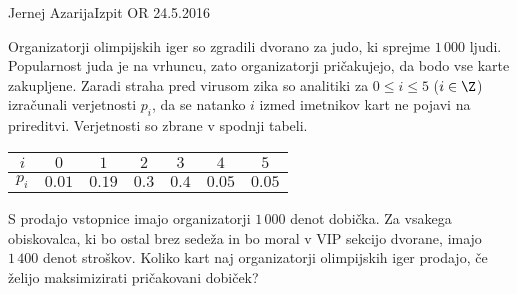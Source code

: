 \begin{naloga}{Jernej Azarija}{Izpit OR 24.5.2016}
\begin{vprasanje}
Organizatorji olimpijskih iger so zgradili dvorano za judo,
ki sprejme $1\,000$ ljudi.
Popularnost juda je na vrhuncu,
zato organizatorji pričakujejo, da bodo vse karte zakupljene.
Zaradi straha pred virusom zika so analitiki
za $0 \le i \le 5$ ($i \in \Z$) izračunali verjetnosti $p_i$,
da se natanko $i$ izmed imetnikov kart ne pojavi na prireditvi.
Verjetnosti so zbrane v spodnji tabeli.
\begin{center}
\begin{tabular}{c|cccccc}
$i$   & $0$    & $1$    & $2$   & $3$   & $4$    & $5$ \\ \hline
$p_i$ & $0.01$ & $0.19$ & $0.3$ & $0.4$ & $0.05$ & $0.05$
\end{tabular}
\end{center}

S prodajo vstopnice imajo organizatorji $1\,000$ denot dobička.
Za vsakega obiskovalca,
ki bo ostal brez sedeža in bo moral v VIP sekcijo dvorane,
imajo $1\,400$ denot stroškov.
Koliko kart naj organizatorji olimpijskih iger prodajo,
če želijo maksimizirati pričakovani dobiček?
\end{vprasanje}
\begin{odgovor}
\end{odgovor}
\end{naloga}

